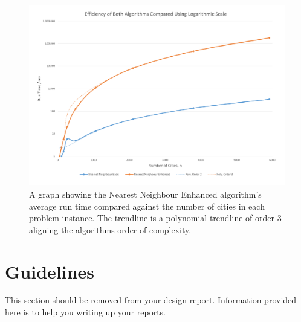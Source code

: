 \documentclass[conference,backref=page]{acmsiggraph}
\begin{document}
\begin{figure}[h]
	\includegraphics[width=\textwidth]{images/efficiency_compared.pdf}
	\caption{A graph showing the Nearest Neighbour Enhanced algorithm's average run time compared against the number of cities in each problem instance. The trendline is a polynomial trendline of order 3 aligning the algorithms order of complexity.}
	\label{efficiencycomparedgraph}
\end{figure}

\clearpage
\section{Guidelines}
This section should be removed from your design report. Information provided here is to help you writing up your reports.
\end{document}
